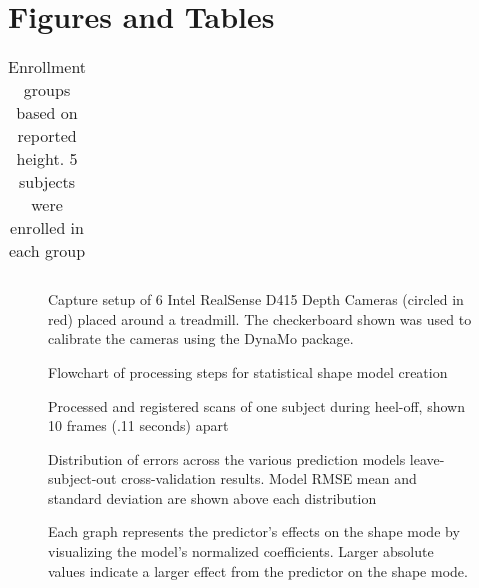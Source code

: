 \documentclass[preprint]{elsarticle}
\begin{document}
\hypertarget{figures-and-tables}{%
\section*{Figures and Tables}\label{figures-and-tables}}



\hypertarget{tbl:groups}{}
\begin{longtable}[]{@{}llll@{}}
\caption{\label{tbl:groups}Enrollment groups based on reported height. 5 subjects were enrolled in each group}\tabularnewline

\end{longtable}



\begin{figure}
\hypertarget{fig:testSetup}{%
\centering
\caption{Capture setup of 6 Intel RealSense D415 Depth Cameras (circled in red) placed around a treadmill. The checkerboard shown was used to calibrate the cameras using the DynaMo package.}\label{fig:testSetup}
}
\end{figure}

\begin{figure}
\hypertarget{fig:dataflow}{%
\centering
\caption{Flowchart of processing steps for statistical shape model creation}\label{fig:dataflow}
}
\end{figure}

\begin{figure}
\hypertarget{fig:scans}{%
\centering
\caption{Processed and registered scans of one subject during heel-off, shown 10 frames (.11 seconds) apart}\label{fig:scans}
}
\end{figure}

\begin{figure}
\hypertarget{fig:modelperf}{%
\centering
\caption{Distribution of errors across the various prediction models leave-subject-out cross-validation results. Model RMSE mean and standard deviation are shown above each distribution}\label{fig:modelperf}
}
\end{figure}

\begin{figure}
\hypertarget{fig:coefs}{%
\centering
\caption{Each graph represents the predictor's effects on the shape mode by visualizing the model's normalized coefficients. Larger absolute values indicate a larger effect from the predictor on the shape mode.}\label{fig:coefs}
}
\end{figure}
\end{document}
